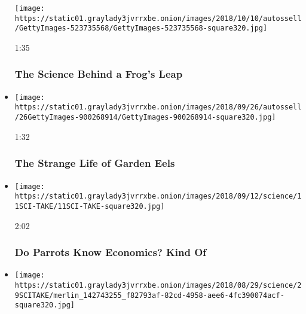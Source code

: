 \begin{itemize}
  \texttt{[image: https://static01.graylady3jvrrxbe.onion/images/2018/10/10/autossell/GettyImages-523735568/GettyImages-523735568-square320.jpg]}

  1:35

  \hypertarget{the-science-behind-a-frogs-leap}{%
  \subsubsection{The Science Behind a Frog's
  Leap}\label{the-science-behind-a-frogs-leap}}
\item
  \href{https://www.nytimes3xbfgragh.onion/video/science/100000006090485/the-strange-life-of-garden-eels.html?action=click\&module=video-series-bar\&region=header\&pgtype=Article\&playlistId=video/sciencetake}{}

  \texttt{[image: https://static01.graylady3jvrrxbe.onion/images/2018/09/26/autossell/26GettyImages-900268914/GettyImages-900268914-square320.jpg]}

  1:32

  \hypertarget{the-strange-life-of-garden-eels}{%
  \subsubsection{The Strange Life of Garden
  Eels}\label{the-strange-life-of-garden-eels}}
\item
  \href{https://www.nytimes3xbfgragh.onion/video/science/100000006079698/parrots-economics-study.html?action=click\&module=video-series-bar\&region=header\&pgtype=Article\&playlistId=video/sciencetake}{}

  \texttt{[image: https://static01.graylady3jvrrxbe.onion/images/2018/09/12/science/11SCI-TAKE/11SCI-TAKE-square320.jpg]}

  2:02

  \hypertarget{do-parrots-know-economics-kind-of}{%
  \subsubsection{Do Parrots Know Economics? Kind
  Of}\label{do-parrots-know-economics-kind-of}}
\item
  \href{https://www.nytimes3xbfgragh.onion/video/science/100000006042011/what-ducks-hear-underwater.html?action=click\&module=video-series-bar\&region=header\&pgtype=Article\&playlistId=video/sciencetake}{}

  \texttt{[image: https://static01.graylady3jvrrxbe.onion/images/2018/08/29/science/29SCITAKE/merlin\_142743255\_f82793af-82cd-4958-aee6-4fc390074acf-square320.jpg]}


\end{itemize}

